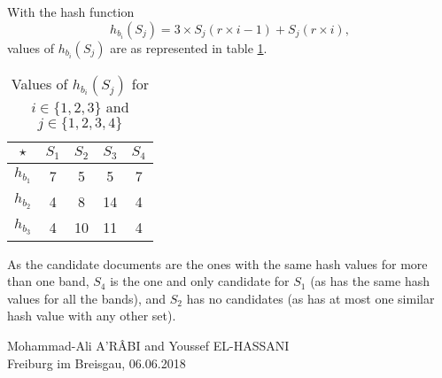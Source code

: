 \documentclass[DIN, pagenumber=false, fontsize=11pt, parskip=half]{scrartcl}
\begin{document}
\begin{enumerate}[label=\alph*)]
\begin{enumerate}[label=(\alph*)]
With the hash function
\[
h_{b_i}(S_j) = 3 \times S_j(r \times i - 1) + S_j(r \times i),
\]
values of $h_{b_i}(S_j)$ are as represented in table \ref{tab:hashs}.

\begin{table}[!hb]
    \centering
    \begin{tabular}{c|cccc}
        $\star$ & $S_1$ & $S_2$ & $S_3$ & $S_4$ \\
        \hline
        $h_{b_1}$ & 7 & 5 & 5 & 7 \\
        $h_{b_2}$ & 4 & 8 & 14 & 4 \\
        $h_{b_3}$ & 4 & 10 & 11 & 4
    \end{tabular}
    \caption{Values of $h_{b_i}(S_j)$ for $i \in \{1, 2, 3\}$ and $j \in \{1, 2, 3, 4\}$}
    \label{tab:hashs}
\end{table}

As the candidate documents are the ones with the same hash values for more than one band, $S_4$ is the one and only candidate for $S_1$ (as has the same hash values for all the bands), and $S_2$ has no candidates (as has at most one similar hash value with any other set).

\end{enumerate}

\end{enumerate}


\vspace{2em}
Mohammad-Ali A'R\^ABI and Youssef EL-HASSANI \\
Freiburg im Breisgau, 06.06.2018
\end{document}

